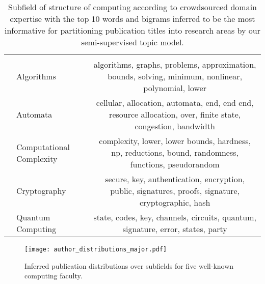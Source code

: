 \documentclass[reprint, twocolumn, aps, nofootinbib, superscriptaddress, longbibliography]{revtex4-1}
\begin{document}
\begin{table*}
\begin{tabularx}{\textwidth}{llC}
       &                                          &                                                                                                                                    \\
                              &                                  Algorithms &                                   algorithms, graphs, problems, approximation, bounds, solving, minimum, nonlinear, polynomial, lower \\
                              &                                    Automata &                          cellular, allocation, automata, end, end end, resource allocation, over, finite state, congestion, bandwidth \\
                              &                    Computational Complexity &                                 complexity, lower, lower bounds, hardness, np, reductions, bound, randomness, functions, pseudorandom \\
                              &                                Cryptography &                                   secure, key, authentication, encryption, public, signatures, proofs, signature, cryptographic, hash \\
                              &                           Quantum Computing &                                                       state, codes, key, channels, circuits, quantum, signature, error, states, party \\
\bottomrule
\end{tabularx}
\caption{Subfield of structure of computing according to crowdsourced domain expertise with the top 10 words and bigrams inferred to be the most informative for partitioning publication titles into research areas by our semi-supervised topic model.} \label{tab:cs_structure}
\end{table*}


\begin{figure*}[h] 
\texttt{[image: author\_distributions\_major.pdf]} 
\caption{Inferred publication distributions over subfields for five well-known computing faculty.}\label{fig:author_distributions} 
\end{figure*} 
\end{document}
